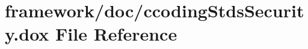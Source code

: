 \hypertarget{ccoding_stds_security_8dox}{}\section{framework/doc/ccoding\+Stds\+Security.dox File Reference}
\label{ccoding_stds_security_8dox}
